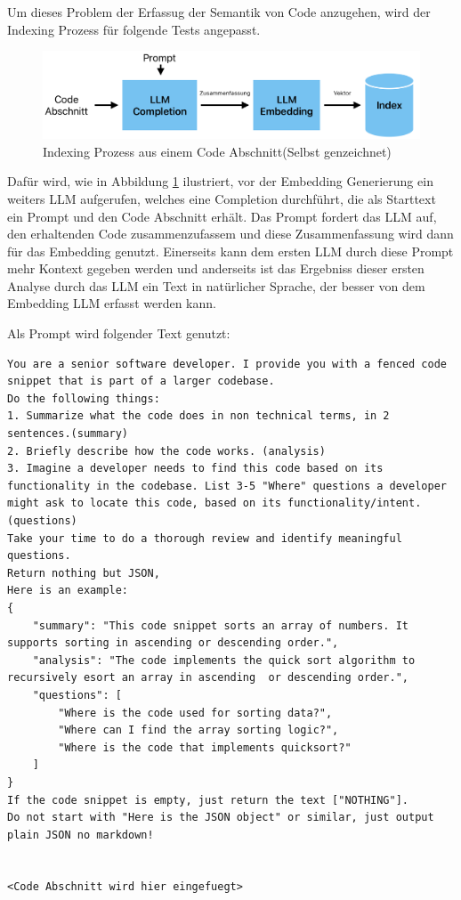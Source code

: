 \documentclass[../main.tex]{subfiles}
\begin{document}
Um dieses Problem der Erfassug der Semantik von Code anzugehen, wird der Indexing Prozess für folgende Tests angepasst.

\begin{figure}[ht]
    \centering
    \includegraphics[scale=.6]{"bilder/prozess.png"}
    \caption{Indexing Prozess aus einem Code Abschnitt(Selbst genzeichnet)}
    \label{fig:indexing}
\end{figure}
Dafür wird, wie in Abbildung \ref{fig:indexing} ilustriert, vor der Embedding Generierung ein weiters \gls{LLM} aufgerufen, welches eine Completion durchführt, die als Starttext ein Prompt und den Code Abschnitt erhält.
Das Prompt fordert das \gls{LLM} auf, den erhaltenden Code zusammenzufassem und diese Zusammenfassung wird dann für das Embedding genutzt.
Einerseits kann dem ersten \gls{LLM} durch diese Prompt mehr Kontext gegeben werden und anderseits ist das Ergebniss dieser ersten Analyse durch das \gls{LLM} ein Text in natürlicher Sprache, der besser von dem Embedding \gls{LLM} erfasst werden kann.
\clearpage

Als Prompt wird folgender Text genutzt:

\begin{lstlisting}
You are a senior software developer. I provide you with a fenced code snippet that is part of a larger codebase.
Do the following things:
1. Summarize what the code does in non technical terms, in 2 sentences.(summary)
2. Briefly describe how the code works. (analysis)
3. Imagine a developer needs to find this code based on its functionality in the codebase. List 3-5 "Where" questions a developer might ask to locate this code, based on its functionality/intent. (questions)
Take your time to do a thorough review and identify meaningful questions.
Return nothing but JSON,
Here is an example:
{
    "summary": "This code snippet sorts an array of numbers. It supports sorting in ascending or descending order.", 
    "analysis": "The code implements the quick sort algorithm to recursively esort an array in ascending  or descending order.",
    "questions": [
        "Where is the code used for sorting data?",
        "Where can I find the array sorting logic?",
        "Where is the code that implements quicksort?"
    ]
}
If the code snippet is empty, just return the text ["NOTHING"].
Do not start with "Here is the JSON object" or similar, just output plain JSON no markdown!


<Code Abschnitt wird hier eingefuegt>
\end{lstlisting}
\end{document}
